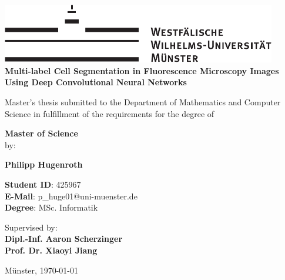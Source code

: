 \begin{centering}
\vspace*{\fill}
\includegraphics[width=12cm]{./img/wwu-logo-neu.pdf}\\[1.5cm]


{\textbf{ \Large
Multi-label Cell Segmentation in Fluorescence Microscopy Images Using Deep Convolutional Neural Networks\\[1.2cm]
}}

{
Master's thesis submitted to the Department of Mathematics and Computer Science in fulfillment of the requirements for the degree of \\[2cm]
}

{\Large \textbf{Master of Science}}\\[2cm]

{
by:
}

{\textbf{ \large
Philipp Hugenroth\\[1cm]
}}

{
\textbf{Student ID}: 425967\\
\textbf{E-Mail}: p\_huge01@uni-muenster.de\\
\textbf{Degree}: MSc. Informatik\\[1cm]
}

    

\hrulefill
                               
{
Supervised by:\\
\textbf{Dipl.-Inf. Aaron Scherzinger}\\
\textbf{Prof. Dr. Xiaoyi Jiang}\\[1cm]
}


{
Münster, \today
}
\vfill
\end{centering}